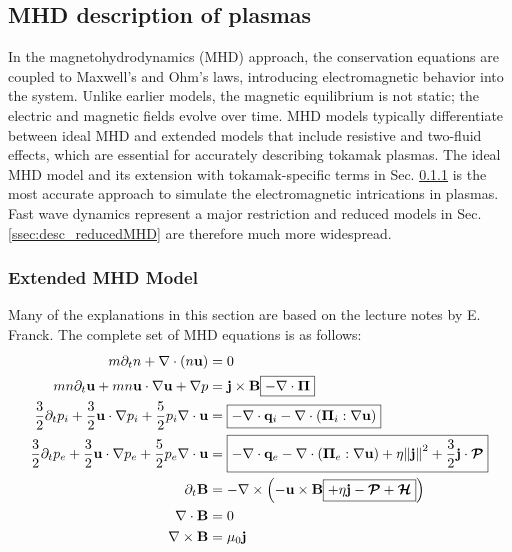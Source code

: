 \subsection{MHD description of plasmas}
\label{sec:desc_MHD}
In the magnetohydrodynamics (MHD) approach, the conservation equations are coupled to Maxwell's and Ohm's laws, introducing electromagnetic behavior into the system. Unlike earlier models, the magnetic equilibrium is not static; the electric and magnetic fields evolve over time. MHD models typically differentiate between ideal MHD and extended models that include resistive and two-fluid effects, which are essential for accurately describing tokamak plasmas. The ideal MHD model and its extension with tokamak-specific terms in Sec. \ref{ssec:desc_extendedMHD} is the most accurate approach to simulate the electromagnetic intrications in plasmas. Fast wave dynamics represent a major restriction and reduced models in Sec. \ref{ssec:desc_reducedMHD} are therefore much more widespread. 

\subsubsection{Extended MHD Model}
\label{ssec:desc_extendedMHD}
Many of the explanations in this section are based on the lecture notes by E. Franck\cite{lessig2016fluid}. The complete set of MHD equations is as follows:
\begin{align}
	m\partial_t n + \nabla \cdot (n \mathbf{u}) &= 0 \label{eq:desc_MHDmass} \\
	mn\partial_t\mathbf{u} + mn\mathbf{u}\cdot\nabla\mathbf{u} + \nabla p &= \mathbf{j} \times \mathbf{B} \boxed{- \nabla \cdot \boldsymbol{\Pi}} \label{eq:desc_MHDmomentum} \\
	\frac{3}{2}\partial_t p_i + \frac{3}{2} \mathbf{u} \cdot \nabla p_i + \frac{5}{2}p_i \nabla \cdot \mathbf{u} &= \boxed{- \nabla \cdot \mathbf{q}_i - \nabla \cdot (\boldsymbol{\Pi}_i : \nabla \mathbf{u})} \label{eq:desc_MHDionpressure} \\
	\frac{3}{2}\partial_t p_e + \frac{3}{2} \mathbf{u} \cdot \nabla p_e + \frac{5}{2}p_e \nabla \cdot \mathbf{u}  &= \boxed{- \nabla \cdot \mathbf{q}_e - \nabla \cdot (\boldsymbol{\Pi}_e : \nabla \mathbf{u}) + \eta \norm{\mathbf{j}}^2 + \frac{3}{2}\mathbf{j}\cdot \bm{\mathcal{P}}} \label{eq:desc_MHDelectronpressure} \\
	\partial_t \mathbf{B} &= -\nabla \times \left(-\mathbf{u} \times \mathbf{B} \boxed{+ \eta \mathbf{j} - \bm{\mathcal{P}} + \bm{\mathcal{H}}}\right) \label{eq:desc_MHDohmlaw} \\
	\nabla \cdot \mathbf{B} &= 0 \label{eq:desc_MHDgausslaw} \\
	\nabla \times \mathbf{B} &= \mu_0 \mathbf{j} \label{eq:desc_MHDamperelaw}
\end{align}

